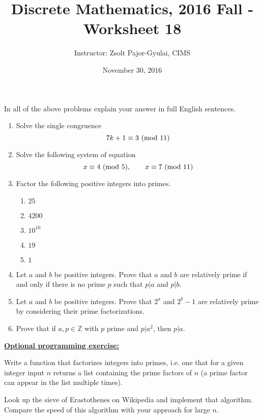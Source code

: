 \documentclass[11pt]{preprint}
\title{Discrete Mathematics, 2016 Fall - Worksheet 18}
\author{Instructor: Zsolt Pajor-Gyulai, CIMS}
\date{November 30, 2016}
\def\enumb{\begin{enumerate}}
\def\enume{\end{enumerate}}
\begin{document}
\maketitle

In all of the above problems explain your answer in full English sentences.

\enumb
\item Solve the single congruence
\[
7k+1\equiv 3~({\rm mod}~11)
\]

\item Solve the following system of equation
\[
x\equiv 4~({\rm mod}~5),\qquad x\equiv 7~({\rm mod}~11)
\]

\item Factor the following positive integers into primes.
\enumb
\item $25$
\item $4200$
\item $10^{10}$
\item $19$
\item $1$
\enume
\item Let $a$ and $b$ be positive integers. Prove that $a$ and $b$ are relatively prime if and only if there is no prime $p$ such that $p|a$ and $p|b$.
\item Let $a$ and $b$ be positive integers. Prove that $2^a$ and $2^b-1$ are relatively prime by considering their prime factorizations.

\item Prove that if $a,p\in\mathbb{Z}$ with $p$ prime and $p|a^2$, then $p|a$.
\enume

\noindent\underline{\textbf{Optional programming exercise:}}

\noindent Write a function that factorizes integers into primes, i.e. one that for a given integer input $n$ returns a list containing the prime factors of $n$ (a prime factor can appear in the list multiple times). 

\noindent Look up the sieve of Erastothenes on Wikipedia and implement that algorithm. Compare the speed of this algorithm with your approach for large $n$.
\end{document}
